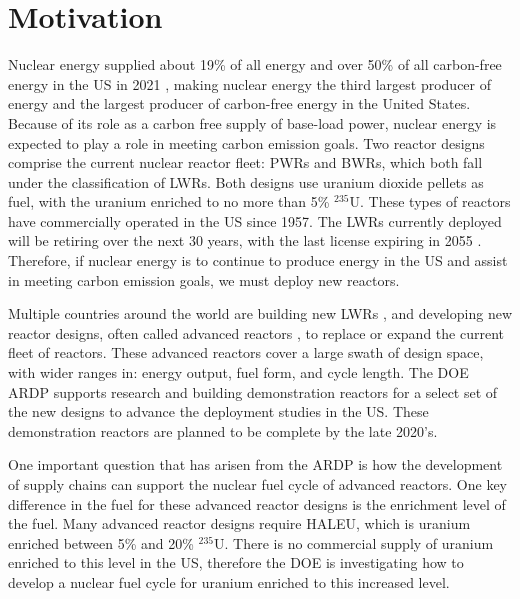 \section{Motivation}
Nuclear energy supplied about 19\% of all energy and over 50\%  
of all carbon-free energy in the US in 2021 
\cite{energy_information_administration_electricity_2022}, making nuclear 
energy the third largest producer of energy and the largest 
producer of carbon-free energy in the United States. Because of its role 
as a carbon free supply of base-load power, nuclear energy is expected 
to play a role in meeting carbon emission goals. Two reactor designs 
comprise the current nuclear reactor fleet: \glspl{PWR} and \glspl{BWR}, 
which both fall under the classification of \glspl{LWR}.
Both designs use uranium dioxide pellets as fuel, with the uranium 
enriched to no more than 5\% $^{235}$U. These types of reactors 
have commercially operated in the US since 1957. The \glspl{LWR} 
currently deployed will be retiring over the next 30 years, with the 
last license expiring in 2055 \cite{nei_us_2021}. Therefore, if 
nuclear energy is to continue to produce energy in the US 
and assist in meeting carbon emission goals, we must deploy new reactors. 

Multiple countries around the world are building new \glspl{LWR}
\cite{world_nuclear_association_plans_2022}, and developing
new reactor designs, often called advanced reactors 
\cite{hussain_advances_2018}, to 
replace or expand the current fleet of reactors. These advanced reactors 
cover a large swath of design space, with wider ranges in: energy output, 
fuel form, and cycle length. The 
\gls{DOE} \gls{ARDP} \cite{noauthor_advanced_nodate}
supports research and building demonstration reactors for a select set of 
the new designs to advance the deployment studies in the US. These 
demonstration reactors are planned to be complete by the late 2020's.

One important question that has arisen from the \gls{ARDP} is how the 
development of supply chains can support the nuclear fuel cycle of 
advanced reactors. 
One key difference in the fuel for these advanced 
reactor designs is the enrichment 
level of the fuel. Many advanced reactor designs require  
\acrfull{HALEU}, which is uranium enriched between 5\% and 20\% $^{235}$U.
There is no commercial supply of 
uranium enriched to this level in the US, therefore the \gls{DOE} 
is investigating how to develop a nuclear fuel cycle for uranium enriched to this 
increased level. 

